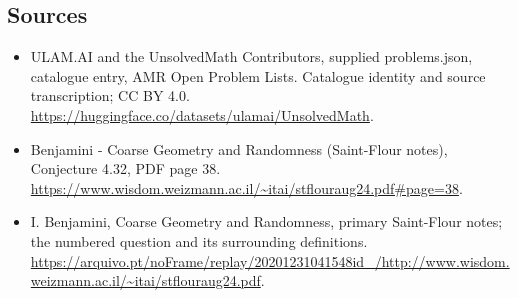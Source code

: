 \documentclass[11pt,a4paper]{article}
\begin{document}
\subsection{Sources}
\begin{itemize}
\item[S1] ULAM.AI and the UnsolvedMath Contributors, supplied problems.json, catalogue entry, AMR Open Problem Lists. Catalogue identity and source transcription; CC BY 4.0.
\url{https://huggingface.co/datasets/ulamai/UnsolvedMath}.
\item[S2] Benjamini - Coarse Geometry and Randomness (Saint-Flour notes), Conjecture 4.32, PDF page 38. 
\url{https://www.wisdom.weizmann.ac.il/~itai/stflouraug24.pdf#page=38}.
\item[S3] I. Benjamini, Coarse Geometry and Randomness, primary Saint-Flour notes; the numbered question and its surrounding definitions.
\url{https://arquivo.pt/noFrame/replay/20201231041548id_/http://www.wisdom.weizmann.ac.il/~itai/stflouraug24.pdf}.
\end{itemize}
\end{document}
